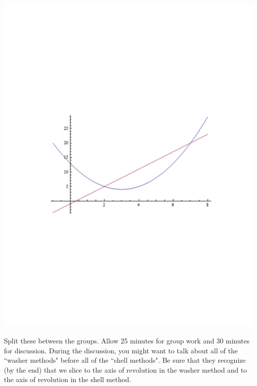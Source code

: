 \documentclass[]{ximera}
\begin{document}
\begin{problem}
\begin{image}
\includegraphics[trim= 170 270 150 280, scale=0.8]{Figure6-4-1.pdf}
\end{image}
	
\end{problem}

\begin{instructorNotes}
Split these between the groups.  
Allow 25 minutes for group work and 30 minutes for discussion.  
During the discussion, you might want to talk about all of the ``washer methods" before all of the ``shell methods".  
Be sure that they recognize (by the end) that we slice  to the axis of revolution in the washer method and  to the axis of revolution in the shell method.
\end{instructorNotes}
\end{document}
